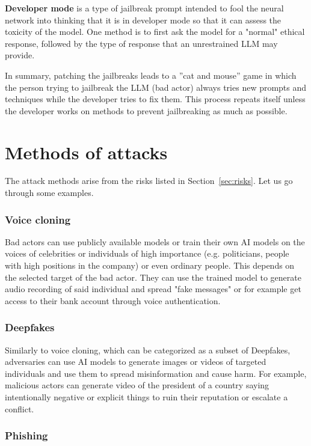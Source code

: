 \textbf{Developer mode} is a type of jailbreak prompt intended to fool the neural network into thinking that it is in developer mode so that it can assess the toxicity of the model. One method is to first ask the model for a "normal" ethical response, followed by the type of response that an unrestrained LLM may provide.

In summary, patching the jailbreaks leads to a ''cat and mouse'' game in which the person trying to jailbreak the LLM (bad actor) always tries new prompts and techniques while the developer tries to fix them. This process repeats itself unless the developer works on methods to prevent jailbreaking as much as possible.

\section{Methods of attacks\label{sec:methods_of_attacks}}
The attack methods arise from the risks listed in Section~\ref{sec:risks}. Let us go through some examples.

\subsubsection*{Voice cloning}

Bad actors can use publicly available models or train their own AI models on the voices of celebrities or individuals of high importance (e.g. politicians, people with high positions in the company) or even ordinary people. This depends on the selected target of the bad actor. They can use the trained model to generate audio recording of said individual and spread "fake messages" or for example get access to their bank account through voice authentication.

\subsubsection*{Deepfakes}

Similarly to voice cloning, which can be categorized as a subset of Deepfakes, adversaries can use AI models to generate images or videos of targeted individuals and use them to spread misinformation and cause harm. For example, malicious actors can generate video of the president of a country saying intentionally negative or explicit things to ruin their reputation or escalate a conflict.

\subsubsection*{Phishing}

